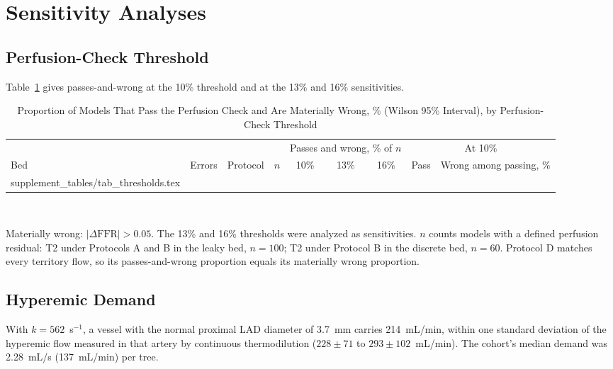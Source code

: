 \documentclass[journal,twoside,web,onecolumn]{ieeecolor}
\begin{document}
\FloatBarrier
{}
\section{Sensitivity Analyses}
\subsection{Perfusion-Check Threshold}
Table~\ref{tab:thr} gives passes-and-wrong at the 10\% threshold and at the 13\% and 16\% sensitivities.
\begin{table}[!ht]
\caption{Proportion of Models That Pass the Perfusion Check and Are Materially Wrong, \% (Wilson 95\% Interval), by
Perfusion-Check Threshold}\label{tab:thr}
\centering\footnotesize
\begin{tabular}{@{}lllrcccrc@{}}
\toprule
 & & & & \multicolumn{3}{c}{Passes and wrong, \% of $n$} & \multicolumn{2}{c}{At 10\%}\\
\cmidrule(lr){5-7}\cmidrule(l){8-9}
Bed & Errors & Protocol & $n$ & 10\% & 13\% & 16\% & Pass & Wrong among passing, \%\\
\midrule
{} supplement_tables/tab_thresholds.tex 
\bottomrule
\end{tabular}
\\[3pt]
\parbox{0.85\textwidth}{\footnotesize Materially wrong: $|\Delta\mathrm{FFR}| > 0.05$. The 13\% and 16\% thresholds were analyzed as sensitivities. $n$ counts models with a
defined perfusion residual: T2 under Protocols A and B in the leaky bed, $n = 100$; T2 under Protocol B in the
discrete bed, $n = 60$. Protocol D matches every territory flow, so its passes-and-wrong proportion equals its
materially wrong proportion.}
\end{table}

\FloatBarrier
{}
\subsection{Hyperemic Demand}\label{sec:demand}
With $k = 562$~s$^{-1}$, a vessel with the normal proximal LAD diameter of 3.7~mm carries 214~mL/min, within one standard deviation of the hyperemic flow measured in that artery by continuous thermodilution ($228 \pm 71$ to $293 \pm 102$~mL/min). The cohort's median demand was 2.28~mL/s (137~mL/min) per tree.


\FloatBarrier
{}
\end{document}
